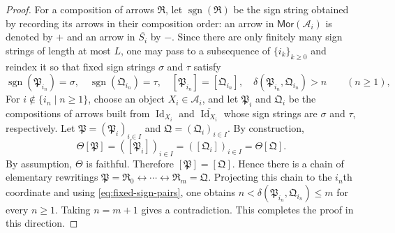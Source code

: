 \documentclass[10pt,a4paper]{amsart}
\theoremstyle{plain}
\theoremstyle{definition}
\theoremstyle{remark}
\begin{document}
\begin{proof}
  For a composition of arrows $\mathfrak R$, let $\operatorname{sgn}(\mathfrak R)$ be the sign string obtained by recording its arrows in their composition order: an arrow in $\mathsf{Mor}(\mathcal A_i)$ is denoted by $+$ and an arrow in $\overline{S_i}$ by $-$.
  Since there are only finitely many sign strings of length at most $L$, one may pass to a subsequence of $\{i_k\}_{k \geq 0}$ and reindex it so that fixed sign strings $\sigma$ and $\tau$ satisfy
  \begin{equation}\label{eq:fixed-sign-pairs}
    \operatorname{sgn}(\mathfrak P_{i_n})=\sigma,\quad
    \operatorname{sgn}(\mathfrak Q_{i_n})=\tau,\quad
    [\mathfrak P_{i_n}]=[\mathfrak Q_{i_n}],\quad
    \delta(\mathfrak P_{i_n},\mathfrak Q_{i_n})>n
    \qquad(n\geq1),
  \end{equation}
  For $i\notin\{i_n\mid n\geq1\}$, choose an object $X_i\in\mathcal A_i$, and let $\mathfrak P_i$ and $\mathfrak Q_i$ be the compositions of arrows built from $\operatorname{Id}_{X_i}$ and $\overline{\operatorname{Id}_{X_i}}$ whose sign strings are $\sigma$ and $\tau$, respectively.
  Let $\mathfrak P = (\mathfrak P_i)_{i\in I}$ and $\mathfrak Q = (\mathfrak Q_i)_{i\in I}$.
  By construction,
  \begin{equation}\label{eq:same-theta-image}
    \Theta[\mathfrak P]
    =([\mathfrak P_i])_{i\in I}
    =([\mathfrak Q_i])_{i\in I}
    =\Theta[\mathfrak Q].
  \end{equation}
  By assumption, $\Theta$ is faithful.
  Therefore $[\mathfrak P]=[\mathfrak Q]$.
  Hence there is a chain of elementary rewritings $\mathfrak P=\mathfrak R_0 \longleftrightarrow\cdots \longleftrightarrow\mathfrak R_m=\mathfrak Q$.
  Projecting this chain to the $i_n$th coordinate and using \eqref{eq:fixed-sign-pairs}, one obtains $n<\delta(\mathfrak P_{i_n},\mathfrak Q_{i_n})\leq m$ for every $n \geq 1$.
  Taking $n=m+1$ gives a contradiction.
  This completes the proof in this direction.

  \medskip


\end{proof}
\end{document}
